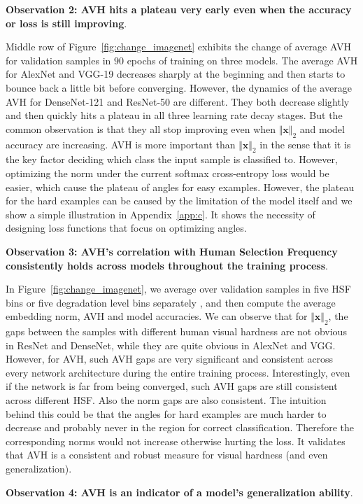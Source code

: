 \textbf{Observation 2: AVH hits a plateau very early even when the accuracy or loss is still improving}.

Middle row of Figure~\ref{fig:change_imagenet} exhibits the change of average AVH for validation samples in $90$ epochs of training on three models. The average AVH for AlexNet and VGG-19 decreases sharply at the beginning and then starts to bounce back a little bit before converging. However, the dynamics of the average AVH for DenseNet-121 and ResNet-50 are different. They both decrease slightly and then quickly hits a plateau in all three learning rate decay stages. But the common observation is that they all stop improving even when $\Vert \bm{x} \Vert_2$ and model accuracy are increasing. AVH is more important than $\Vert \bm{x} \Vert_2$ in the sense that it is the key factor deciding which class the input sample is classified to. However, optimizing the norm under the current softmax cross-entropy loss would be easier, which cause the plateau of angles for easy examples. However, the plateau for the hard examples can be caused by the limitation of the model itself and we show a simple illustration in Appendix~\ref{app:c}. It shows the necessity of designing loss functions that focus on optimizing angles. 

\textbf{Observation 3: AVH's correlation with Human Selection Frequency consistently holds across models throughout the training process}.

In Figure~\ref{fig:change_imagenet}, we average over validation samples in five HSF bins or five degradation level bins separately , and then compute the average embedding norm, AVH and model accuracies. We can observe that for $\Vert \bm{x} \Vert_2$, the gaps between the samples with different human visual hardness are not obvious in ResNet and DenseNet, while they are quite obvious in AlexNet and VGG. However, for AVH, such AVH gaps are very significant and consistent across every network architecture during the entire training process. Interestingly, even if the network is far from being converged, such AVH gaps are still consistent across different HSF. Also the norm gaps are also consistent. The intuition behind this could be that the angles for hard examples are much harder to decrease and probably never in the region for correct classification. Therefore the corresponding norms would not increase otherwise hurting the loss. It validates that AVH is a consistent and robust measure for visual hardness (and even generalization).

\textbf{Observation 4: AVH is an indicator of a model's generalization ability}.

